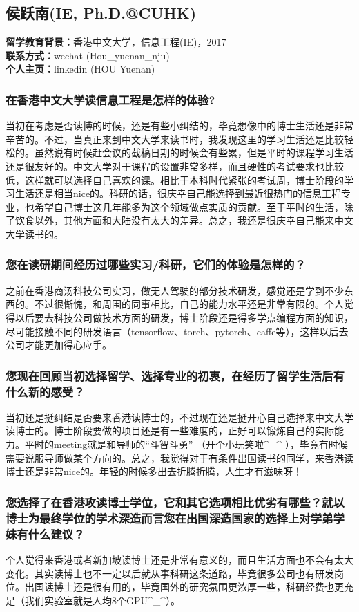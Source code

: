 \documentclass[a4paper,UTF8]{book}
\begin{document}
\clearpage
\subsection{侯跃南(IE, Ph.D.@CUHK)}
    \textbf{留学教育背景：}香港中文大学，信息工程(IE)，2017\\
    \textbf{联系方式：}wechat (Hou\_yuenan\_nju)\\
    \textbf{个人主页：}linkedin (HOU Yuenan)

    \subsubsection*{在香港中文大学读信息工程是怎样的体验?}
    当初在考虑是否读博的时候，还是有些小纠结的，毕竟想像中的博士生活还是非常辛苦的。不过，当真正来到中文大学来读书时，我发现这里的学习生活还是比较轻松的。虽然说有时候赶会议的截稿日期的时候会有些累，但是平时的课程学习生活还是很友好的。中文大学对于课程的设置非常多样，而且硬性的考试要求也比较低，这样就可以选择自己喜欢的课。相比于本科时代紧张的考试周，博士阶段的学习生活还是相当nice的。科研的话，很庆幸自己能选择到最近很热门的信息工程专业，也希望自己博士这几年能多为这个领域做点实质的贡献。至于平时的生活，除了饮食以外，其他方面和大陆没有太大的差异。总之，我还是很庆幸自己能来中文大学读书的。

    \subsubsection*{您在读研期间经历过哪些实习/科研，它们的体验是怎样的？}
    之前在香港商汤科技公司实习，做无人驾驶的部分技术研发，感觉还是学到不少东西的。不过很惭愧，和周围的同事相比，自己的能力水平还是非常有限的。个人觉得以后要去科技公司做技术方面的研发，博士阶段还是得多学点编程方面的知识，尽可能接触不同的研发语言（tensorflow、torch、pytorch、caffe等），这样以后去公司才能更加得心应手。

    \subsubsection*{您现在回顾当初选择留学、选择专业的初衷，在经历了留学生活后有什么新的感受？}
    当初还是挺纠结是否要来香港读博士的，不过现在还是挺开心自己选择来中文大学读博士的。博士阶段要做的项目还是有一些难度的，正好可以锻炼自己的实际能力。平时的meeting就是和导师的“斗智斗勇” （开个小玩笑啦\^{}\_\^{} ），毕竟有时候需要说服导师做某个方向的。总之，我觉得对于有条件出国读书的同学，来香港读博士还是非常nice的。年轻的时候多出去折腾折腾，人生才有滋味呀！

    \subsubsection*{您选择了在香港攻读博士学位，它和其它选项相比优劣有哪些？就以博士为最终学位的学术深造而言您在出国深造国家的选择上对学弟学妹有什么建议？}
    个人觉得来香港或者新加坡读博士还是非常有意义的，而且生活方面也不会有太大变化。其实读博士也不一定以后就从事科研这条道路，毕竟很多公司也有研发岗位。出国读博士还是很有用的，毕竟国外的研究氛围更浓厚一些，科研经费也更充足（我们实验室就是人均8个GPU\^{}\_\^{}）。
\end{document}
